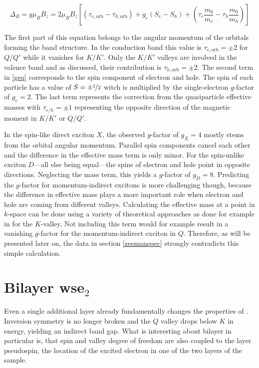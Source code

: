\[\Delta_B=g\mu_BB_z = 2\mu_BB_z\left[(\tau_{e, \mathrm{orb}}-\tau_{h, \mathrm{orb}})+g_e(S_e-S_h) + \left(\tau_e \frac{m_0}{m_e}-\tau_h \frac{m_0}{m_h}\right)\right]\label{geq}\]

The first part of this equation belongs to the angular momentum of the orbitals forming the band structure. In the conduction band this value is $\tau_{e, \mathrm{orb}}=\pm2$ for $Q/Q'$ while it vanishes for $K/K'$. Only the $K/K'$ valleys are involved in the valence band and as discussed, their contribution is $\tau_{h, \mathrm{orb}}=\pm2$. The second term in \eqref{geq} corresponds to the spin component of electron and hole. The spin of each particle has a value of $S=\pm\nicefrac{1}{2}$ witch is multiplied by the single-electron $g$-factor of $g_e=2$. The last term represents the correction from the quasiparticle effective masses with $\tau_{e/h}=\pm1$ representing the opposite direction of the magnetic moment in $K/K'$ or $Q/Q'$.

In the spin-like direct exciton $X$, the observed $g$-factor of $g_X=4$ mostly stems from the orbital angular momentum. Parallel spin components cancel each other and the difference in the effective mass term is only minor. For the spin-unlike exciton $D$---all else being equal---the spins of electron and hole point in opposite directions. Neglecting the mass term, this yields a $g$-factor of $g_D=8$. Predicting the $g$-factor for momentum-indirect excitons is more challenging though, because the difference in effective mass plays a more important role when electron and hole are coming from different valleys. Calculating the effective mass at a point in $k$-space can be done using a variety of theoretical approaches as done for example in \cite{rybkovskiy_atomically_2017} for the $K$-valley. Not including this term would for example result in a vanishing $g$-factor for the momentum-indirect exciton in $Q$. Therefore, as will be presented later on, the data in section \ref{zeemanspec} strongly contradicts this simple calculation.

\section{Bilayer ws\textup{e}$_2$}\label{bilayer_theory}

Even a single additional layer already fundamentally changes the properties of \wse\!. Inversion symmetry is no longer broken and the $Q$ valley drops below $K$ in energy, yielding an indirect band gap\cite{zibouche_transition-metal_2014_2}. What is interesting about bilayer \wse in particular is, that spin and valley degree of freedom are also coupled to the layer pseudospin, the location of the excited electron in one of the two layers of the sample\cite{jones_spin-layer_2014}. 

